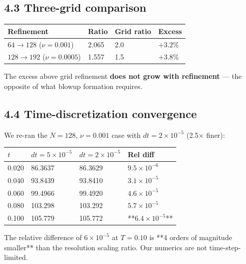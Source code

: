 \documentclass[11pt]{article}
\begin{document}
\subsection*{4.3 Three-grid comparison}

\begin{table}[h]
\centering
\begin{tabular}{llll}
\toprule
Refinement & Ratio & Grid ratio & Excess \\
\midrule
\(64 \to 128\) (\(\nu = 0.001\)) & 2.065 & 2.0 & \(+3.2\%\) \\
\(128 \to 192\) (\(\nu = 0.0005\)) & 1.557 & 1.5 & \(+3.8\%\) \\
\bottomrule
\end{tabular}
\end{table}


The excess above grid refinement \textbf{does not grow with refinement} —
the opposite of what blowup formation requires.


\subsection*{4.4 Time-discretization convergence}

We re-ran the \(N = 128\), \(\nu = 0.001\) case with \(dt = 2 \times 10^{-5}\)
(2.5× finer):

\begin{table}[h]
\centering
\begin{tabular}{llll}
\toprule
\(t\) & \(dt = 5 \times 10^{-5}\) & \(dt = 2 \times 10^{-5}\) & Rel diff \\
\midrule
0.020 & 86.3637 & 86.3629 & \(9.5 \times 10^{-6}\) \\
0.040 & 93.8439 & 93.8410 & \(3.1 \times 10^{-5}\) \\
0.060 & 99.4966 & 99.4920 & \(4.6 \times 10^{-5}\) \\
0.080 & 103.298 & 103.292 & \(5.7 \times 10^{-5}\) \\
0.100 & 105.779 & 105.772 & **\(6.4 \times 10^{-5}\)** \\
\bottomrule
\end{tabular}
\end{table}


The relative difference of \(6 \times 10^{-5}\) at \(T = 0.10\) is **4 orders
of magnitude smaller** than the resolution scaling ratio. Our numerics
are not time-step-limited.
\end{document}
